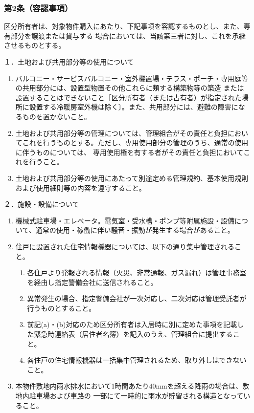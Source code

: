 \documentclass[
  twoside,
  luatex,
  paper=a4paper,
  fontsize=11pt,
  jafontsize=11pt,
  jlreq_notes,
]{jlreq}
\begin{document}
  \subsubsection*{第2条（容認事項）}
  区分所有者は、対象物件購入にあたり、下記事項を容認するものとし、また、専有部分を譲渡または貸与する
  場合においては、当該第三者に対し、これを承継させるものとする。

  \noindent
  １．土地および共用部分等の使用について
  \begin{enumerate}
    \item バルコニー・サービスバルコニー・室外機置場・テラス・ポーチ・専用庭等の共用部分には、設置型物置その他これらに類する構築物等の築造
    または設置することはできないこと［区分所有者（または占有者）が指定された場所に設置する冷暖房室外機は除く〕。また、共用部分には、避難の障害になるものを置かないこと。
    \item 土地および共用部分等の管理については、管理組合がその責任と負担においてこれを行うものとする。ただし、専用使用部分の管理のうち、通常の使用に伴うものについては、
          専用使用権を有する者がその責任と負担においてこれを行うこと。
    \item 土地および共用部分等の使用にあたって別途定める管理規約、基本使用規則および使用細則等の内容を遵守すること。
  \end{enumerate}
  ２．施設・設備について
  \begin{enumerate}
    \item 機械式駐車場・エレベータ。電気室・受水槽・ポンプ等附属施設・設備について、通常の使用・稼働に伴い騒音・振動が発生する場合があること。
    \item 住戸に設置された住宅情報機器については、以下の通り集中管理されること。
      \begin{enumerate}
        \item 各住戸より発報される情報（火災、非常通報、ガス漏れ）は管理事務室を経由し指定警備会社に送信されること。
        \item 異常発生の場合、指定警備会社が一次対応し、二次対応は管理受託者が行うものとすること。
        \item 前記(a)・(b)対応のため区分所有者は入居時に別に定めた事項を記載した緊急時連絡表（居住者名簿）を記入のうえ、管理組合に提出すること。
        \item 各住戸の住宅情報機器は一括集中管理されるため、取り外しはできないこと。
      \end{enumerate}
  \item 本物件敷地内雨水排水において1時間あたり40mmを超える降雨の場合は、敷地内駐車場および車路の
        一部にて一時的に雨水が貯留される構造となっていること。
  \end{enumerate}
\end{document}
